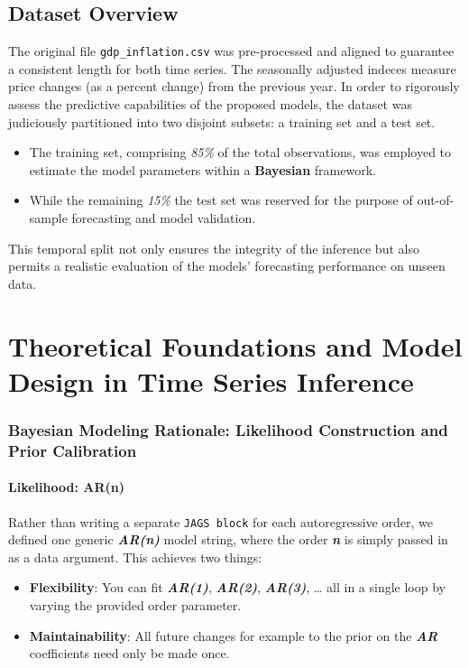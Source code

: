 \documentclass{Configuration_Files/PoliMi3i_thesis}
\begin{document}
\section{Dataset Overview}
The original file \texttt{gdp\_inflation.csv} was pre-processed and aligned to guarantee a consistent length for both time series.
The seasonally adjusted indeces measure price changes (as a percent change) from the previous year. 
In order to rigorously assess the predictive capabilities of the proposed models, the dataset was judiciously partitioned into two disjoint subsets: a training set and a test set. 
\begin{itemize}
    \item The training set, comprising \textit{85\%} of the total observations, was employed to estimate the model parameters within a \textbf{Bayesian} framework.
    \item While the remaining \textit{15\%} the test set was reserved for the purpose of out-of-sample forecasting and model validation.
\end{itemize}
This temporal split not only ensures the integrity of the inference but also permits a realistic evaluation of the models’ forecasting performance on unseen data.

\chapter{Theoretical Foundations and Model Design in Time Series Inference}
\label{ch:chapter_two}
\subsection{Bayesian Modeling Rationale: Likelihood Construction and Prior Calibration}
\subsubsection{Likelihood: AR(n)}
Rather than writing a separate \texttt{JAGS block} for each autoregressive order, we defined one generic \textbf{\textit{AR(n)}} model string, where the order \textbf{\textit{n}} is simply passed in as a data argument.  This achieves two things:
\begin{itemize}
    \item \textbf{Flexibility}:  You can fit \textbf{\textit{AR(1)}}, \textbf{\textit{AR(2)}}, \textbf{\textit{AR(3)}}, … all in a single loop by varying the provided order parameter.
	\item \textbf{Maintainability}:  All future changes for example to the prior on the \textbf{\textit{AR}} coefficients need only be made once.
\end{itemize}
\end{document}
